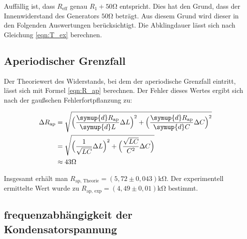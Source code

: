 Auffällig ist, dass $R_{\text{eff}}$ genau $R_1 + 50\unit{\ohm}$ entspricht. Dies hat den Grund, dass der Innenwiderstand des Generators
$50 \unit{\ohm}$ beträgt. Aus diesem Grund wird dieser in den Folgenden Auswertungen berücksichtigt.
Die Abklingdauer lässt sich nach Gleichung \eqref{eqn:T_ex} berechnen.

\subsection{Aperiodischer Grenzfall}
\label{subsec:AuswertungB}

Der Theoriewert des Widerstands, bei dem der aperiodische Grenzfall eintritt, lässt sich mit Formel \eqref{eqn:R_ap} berechnen.
Der Fehler dieses Wertes ergibt sich nach der gaußschen Fehlerfortpflanzung zu:

\begin{align*}
  \label{eqn:err_R_ap}
  \Delta R_{\text{ap}} &= \sqrt{\Bigl(\frac{\symup{d}R_{\text{ap}}}{\symup{d}L}\Delta L \Bigr)^2+\Bigl(\frac{\symup{d}R_{\text{ap}}}{\symup{d}C}\Delta C\Bigr)^2} \\
  &= \sqrt{\Bigl(\frac{1}{\sqrt{LC}}\Delta L\Bigr)^2+\Bigl(\frac{\sqrt{LC}}{C^2}\Delta C\Bigr)} \\
  &\approx 43 \unit{\ohm}
\end{align*}

Insgesamt erhält man $R_{\text{ap, Theorie}} = (5,72 \pm 0,043) \unit{\kilo\ohm}$. Der experimentell ermittelte Wert wurde 
zu $R_{\text{ap, exp}} = (4,49 \pm 0,01) \unit{\kilo\ohm}$ bestimmt.

\subsection{frequenzabhängigkeit der Kondensatorspannung}
\label{subsec:AuswertungC}

